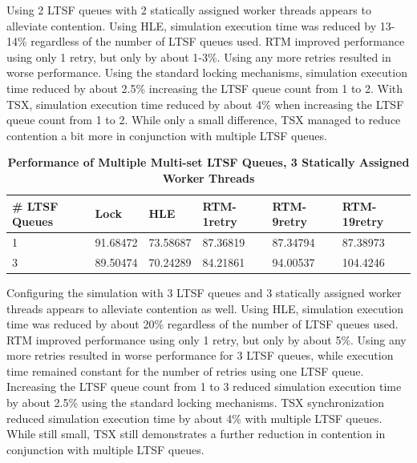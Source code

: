 \documentclass[11pt]{book}
\begin{document}
Using 2 LTSF queues with 2 statically assigned worker threads appears to
alleviate contention.  Using HLE, simulation execution time was reduced by
13-14\% regardless of the number of LTSF queues used.  RTM improved performance
using only 1 retry, but only by about 1-3\%.  Using any more retries resulted in
worse performance.  Using the standard locking mechanisms, simulation execution
time reduced by about 2.5\% increasing the LTSF queue count from 1 to 2.  With
TSX, simulation execution time reduced by about 4\%  when increasing the LTSF
queue count from 1 to 2.  While only a small difference, TSX managed to reduce
contention a bit more in conjunction with multiple LTSF queues.

\begin{table}
    \centering
    \begin{tabular}{l|p{2cm}|p{2cm}|p{2cm}|p{2cm}|p{2cm}}
        \textbf{\# LTSF Queues}&Lock &HLE &RTM-1retry &RTM-9retry &RTM-19retry \\
        \hline
        \midrule
            1 &91.68472 &73.58687 &87.36819 &87.34794 &87.38973 \\ 
            3 &89.50474 &70.24289 &84.21861 &94.00537 &104.4246 \\
    \end{tabular}
    \caption{\textbf{Performance of Multiple Multi-set LTSF Queues, 3 Statically Assigned Worker Threads}}
    \label{tab:noThrMig_3threadsXschq}
\end{table}

Configuring the simulation with 3 LTSF queues and 3 statically assigned worker
threads appears to alleviate contention as well.  Using HLE, simulation
execution time was reduced by about 20\% regardless of the number of LTSF queues
used.  RTM improved performance using only 1 retry, but only by about 5\%.
Using any more retries resulted in worse performance for 3 LTSF queues, while
execution time remained constant for the number of retries using one LTSF queue.
Increasing the LTSF queue count from 1 to 3 reduced simulation execution time by
about 2.5\% using the standard locking mechanisms.  TSX synchronization reduced
simulation execution time by about 4\% with multiple LTSF queues.  While still
small, TSX still demonstrates a further reduction in contention in conjunction
with multiple LTSF queues.
\end{document}
